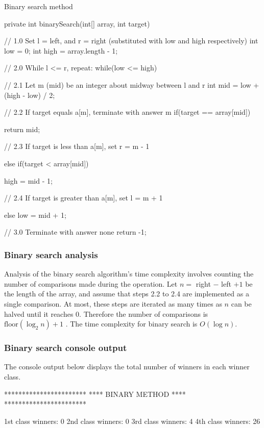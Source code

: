 \begin{listing}[H]
\caption{Binary search method}
\begin{javacode}
private int binarySearch(int[] array, int target) {

    // 1.0 Set l = left, and r = right (substituted with low and high respectively)
    int low = 0;
    int high = array.length - 1;

    // 2.0 While l <= r, repeat:
    while(low <= high) {

        // 2.1 Let m (mid) be an integer about midway between l and r
        int mid = low + (high - low) / 2;

        // 2.2 If target equals a[m], terminate with answer m
        if(target == array[mid]) {
            return mid;

        // 2.3 If target is less than a[m], set r = m - 1
        } else if(target < array[mid]) {
            high = mid - 1;

        // 2.4 If target is greater than a[m], set l = m + 1
        } else {
            low = mid + 1;
        }
    }

    // 3.0 Terminate with answer none
    return -1;
}
\end{javacode}
\end{listing}

\subsubsection{Binary search analysis}

Analysis of the binary search algorithm's time complexity involves counting the number of comparisons made during the operation. Let $n =$ right $-$ left $+ 1$ be the length of the array, and assume that steps 2.2 to 2.4 are implemented as a single comparison. At most, these steps are iterated as many times as $n$ can be halved until it reaches 0. Therefore the number of comparisons is $\mbox{floor}(\log_2n) + 1$ \citep{Watt2001}. The time complexity for binary search is $O(\log n)$.

\newpage
\subsubsection{Binary search console output}

The console output below displays the total number of winners in each winner class.
\\
\begin{consolecode}
***********************
**** BINARY METHOD ****
***********************

1st class winners: 0
2nd class winners: 0
3rd class winners: 4
4th class winners: 26
\end{consolecode}

